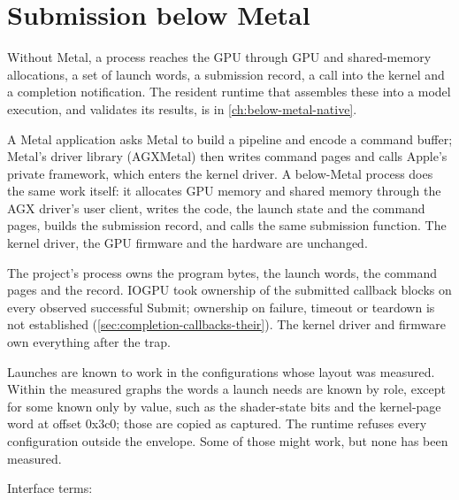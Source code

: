 \chapter{Submission below Metal}\label{ch:submission-below-metal}

Without Metal, a process reaches the GPU through GPU and shared-memory allocations, a set of launch words, a submission
record, a call into the kernel and a completion notification. The resident runtime that assembles these into a model
execution, and validates its results, is in \cref{ch:below-metal-native}.

A Metal application asks Metal to build a pipeline and encode a command buffer; Metal's driver library
(AGXMetal) then writes command pages and calls Apple's private  framework, which enters the kernel driver. A
below-Metal process does the same work itself: it allocates GPU memory and shared memory through the AGX driver's user
client, writes the code, the launch state and the command pages, builds the submission record, and calls the same 
submission function. The kernel driver, the GPU firmware and the hardware are unchanged.

The project's process owns the program bytes, the launch words, the command pages and the record.
IOGPU took ownership of the submitted callback blocks on every observed successful Submit; ownership on failure, timeout
or teardown is not established (\cref{sec:completion-callbacks-their}). The kernel driver and firmware own
everything after the trap.

Launches are known to work in the configurations whose layout was measured. Within the
measured graphs the words a launch needs are known by role, except for some known only by value, such as the
shader-state bits and the kernel-page word at offset 0x3c0; those are copied as captured. The runtime refuses every
configuration outside the envelope. Some of those might work, but none has been measured.

Interface terms:


